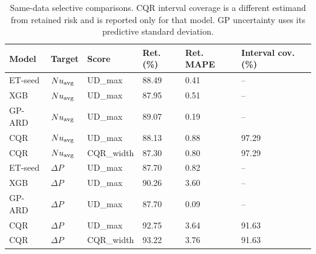 \begin{table}[htbp]\centering\scriptsize\caption{Same-data selective comparisons. CQR interval coverage is a different estimand from retained risk and is reported only for that model. GP uncertainty uses its predictive standard deviation.}\label{tab:competitors}
\begin{tabular}{llllll}\toprule
Model & Target & Score & Ret. (\%) & Ret. MAPE & Interval cov. (\%)\\\midrule
ET-seed & $Nu_{\rm avg}$ & UD\_max & 88.49 & 0.41 & --\\
XGB & $Nu_{\rm avg}$ & UD\_max & 87.95 & 0.51 & --\\
GP-ARD & $Nu_{\rm avg}$ & UD\_max & 89.07 & 0.19 & --\\
CQR & $Nu_{\rm avg}$ & UD\_max & 88.13 & 0.88 & 97.29\\
CQR & $Nu_{\rm avg}$ & CQR\_width & 87.30 & 0.80 & 97.29\\
ET-seed & $\Delta P$ & UD\_max & 87.70 & 0.82 & --\\
XGB & $\Delta P$ & UD\_max & 90.26 & 3.60 & --\\
GP-ARD & $\Delta P$ & UD\_max & 87.70 & 0.09 & --\\
CQR & $\Delta P$ & UD\_max & 92.75 & 3.64 & 91.63\\
CQR & $\Delta P$ & CQR\_width & 93.22 & 3.76 & 91.63\\
\bottomrule\end{tabular}\end{table}
